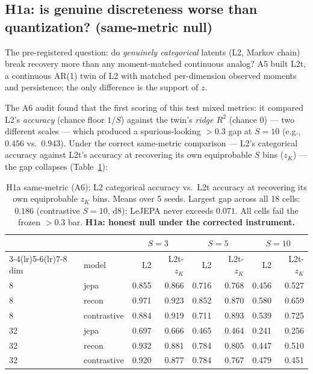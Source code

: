\documentclass[11pt]{article}
\begin{document}
\subsection{H1a: is genuine discreteness worse than quantization? (same-metric null)}
\label{sec:h1a}
The pre-registered question: do \emph{genuinely categorical} latents (L2,
Markov chain) break recovery more than any moment-matched continuous analog?
A5 built L2t, a continuous AR(1) twin of L2 with matched per-dimension
observed moments and persistence; the only difference is the support of $z$.

The A6 audit found that the first scoring of this test mixed metrics: it
compared L2's \emph{accuracy} (chance floor $1/S$) against the twin's
\emph{ridge $R^2$} (chance 0) --- two different scales --- which produced a
spurious-looking $>0.3$ gap at $S{=}10$ (e.g., $0.456$ vs.\ $0.943$). Under the
correct same-metric comparison --- L2's categorical accuracy against L2t's
accuracy at recovering its own equiprobable $S$ bins ($z_K$) --- the gap
collapses (Table~\ref{tab:h1a}):

\begin{table}[ht]\centering\small
\begin{tabular}{@{}llrrrrrr@{}}
\toprule
 & & \multicolumn{2}{c}{$S{=}3$} & \multicolumn{2}{c}{$S{=}5$} & \multicolumn{2}{c}{$S{=}10$} \\
\cmidrule(lr){3-4}\cmidrule(lr){5-6}\cmidrule(lr){7-8}
dim & model & L2 & L2t-$z_K$ & L2 & L2t-$z_K$ & L2 & L2t-$z_K$ \\
\midrule
8 & jepa & 0.855 & 0.866 & 0.716 & 0.768 & 0.456 & 0.527 \\
8 & recon & 0.971 & 0.923 & 0.852 & 0.870 & 0.580 & 0.659 \\
8 & contrastive & 0.884 & 0.919 & 0.711 & 0.893 & 0.539 & 0.725 \\
32 & jepa & 0.697 & 0.666 & 0.465 & 0.464 & 0.241 & 0.256 \\
32 & recon & 0.932 & 0.881 & 0.784 & 0.805 & 0.447 & 0.510 \\
32 & contrastive & 0.920 & 0.877 & 0.784 & 0.767 & 0.479 & 0.451 \\
\bottomrule
\end{tabular}
\caption{H1a same-metric (A6): L2 categorical accuracy vs.\ L2t accuracy at
recovering its own equiprobable $z_K$ bins. Means over 5 seeds. Largest gap
across all 18 cells: $0.186$ (contrastive $S{=}10$, d8); LeJEPA never exceeds
$0.071$. All cells fail the frozen $>0.3$ bar. \textbf{H1a: honest null under
the corrected instrument.}}
\label{tab:h1a}
\end{table}
\end{document}
